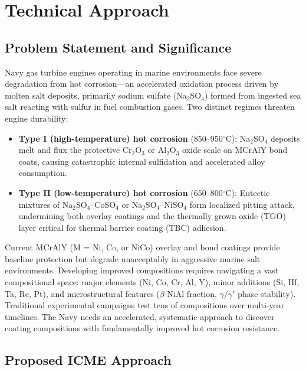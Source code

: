 \documentclass[11pt,letterpaper]{article}
\begin{document}
\newpage

\section{Technical Approach}
\label{sec:technical_approach}

\subsection{Problem Statement and Significance}

Navy gas turbine engines operating in marine environments face severe degradation from hot corrosion---an accelerated oxidation process driven by molten salt deposits, primarily sodium sulfate (Na$_2$SO$_4$) formed from ingested sea salt reacting with sulfur in fuel combustion gases. Two distinct regimes threaten engine durability:

\begin{itemize}[nosep]
  \item \textbf{Type I (high-temperature) hot corrosion} (850--950$^\circ$C): Na$_2$SO$_4$ deposits melt and flux the protective Cr$_2$O$_3$ or Al$_2$O$_3$ oxide scale on MCrAlY bond coats, causing catastrophic internal sulfidation and accelerated alloy consumption.
  \item \textbf{Type II (low-temperature) hot corrosion} (650--800$^\circ$C): Eutectic mixtures of Na$_2$SO$_4$--CoSO$_4$ or Na$_2$SO$_4$--NiSO$_4$ form localized pitting attack, undermining both overlay coatings and the thermally grown oxide (TGO) layer critical for thermal barrier coating (TBC) adhesion.
\end{itemize}

Current MCrAlY (M = Ni, Co, or NiCo) overlay and bond coatings provide baseline protection but degrade unacceptably in aggressive marine salt environments. Developing improved compositions requires navigating a vast compositional space: major elements (Ni, Co, Cr, Al, Y), minor additions (Si, Hf, Ta, Re, Pt), and microstructural features ($\beta$-NiAl fraction, $\gamma/\gamma'$ phase stability). Traditional experimental campaigns test tens of compositions over multi-year timelines. The Navy needs an accelerated, systematic approach to discover coating compositions with fundamentally improved hot corrosion resistance.

\subsection{Proposed ICME Approach}
\end{document}
